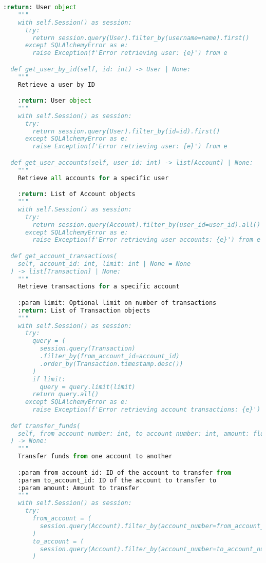 \begin{lstlisting}[language=Python]
    :return: User object
    """
    with self.Session() as session:
      try:
        return session.query(User).filter_by(username=name).first()
      except SQLAlchemyError as e:
        raise Exception(f'Error retrieving user: {e}') from e

  def get_user_by_id(self, id: int) -> User | None:
    """
    Retrieve a user by ID

    :return: User object
    """
    with self.Session() as session:
      try:
        return session.query(User).filter_by(id=id).first()
      except SQLAlchemyError as e:
        raise Exception(f'Error retrieving user: {e}') from e

  def get_user_accounts(self, user_id: int) -> list[Account] | None:
    """
    Retrieve all accounts for a specific user

    :return: List of Account objects
    """
    with self.Session() as session:
      try:
        return session.query(Account).filter_by(user_id=user_id).all()
      except SQLAlchemyError as e:
        raise Exception(f'Error retrieving user accounts: {e}') from e

  def get_account_transactions(
    self, account_id: int, limit: int | None = None
  ) -> list[Transaction] | None:
    """
    Retrieve transactions for a specific account

    :param limit: Optional limit on number of transactions
    :return: List of Transaction objects
    """
    with self.Session() as session:
      try:
        query = (
          session.query(Transaction)
          .filter_by(from_account_id=account_id)
          .order_by(Transaction.timestamp.desc())
        )
        if limit:
          query = query.limit(limit)
        return query.all()
      except SQLAlchemyError as e:
        raise Exception(f'Error retrieving account transactions: {e}') from e

  def transfer_funds(
    self, from_account_number: int, to_account_number: int, amount: float
  ) -> None:
    """
    Transfer funds from one account to another

    :param from_account_id: ID of the account to transfer from
    :param to_account_id: ID of the account to transfer to
    :param amount: Amount to transfer
    """
    with self.Session() as session:
      try:
        from_account = (
          session.query(Account).filter_by(account_number=from_account_number).first()
        )
        to_account = (
          session.query(Account).filter_by(account_number=to_account_number).first()
        )


\end{lstlisting}
